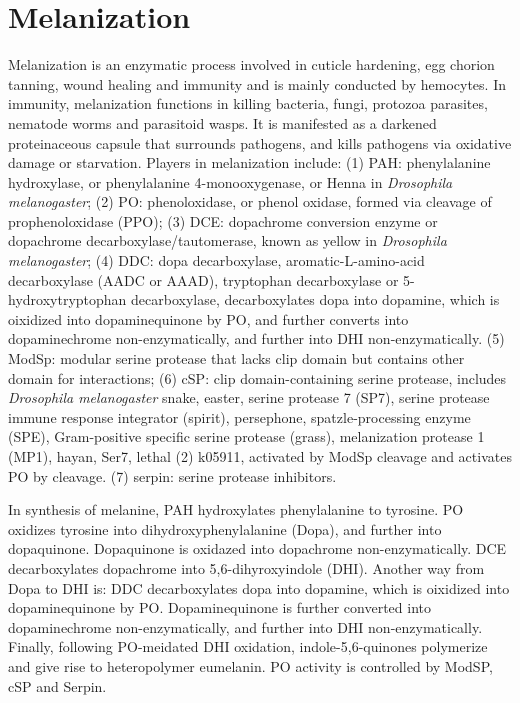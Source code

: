 \documentclass[11pt]{article}
\begin{document}
\begin{sloppypar}
\section*{Melanization}
Melanization is an enzymatic process involved in cuticle hardening, egg chorion tanning, wound healing and immunity and is mainly conducted by hemocytes. 
In immunity, melanization functions in killing bacteria, fungi, protozoa parasites, nematode worms and parasitoid wasps. 
It is manifested as a darkened proteinaceous capsule that surrounds pathogens, and kills pathogens via oxidative damage or starvation. 
Players in melanization include:
\newline
(1) PAH: phenylalanine hydroxylase, or phenylalanine 4-monooxygenase, or Henna in \textit{Drosophila melanogaster}; \newline
(2) PO: phenoloxidase, or phenol oxidase, formed via cleavage of prophenoloxidase (PPO); \newline
(3) DCE: dopachrome conversion enzyme or dopachrome decarboxylase/tautomerase, known as yellow in \textit{Drosophila melanogaster}; \newline
(4) DDC: dopa decarboxylase, aromatic-L-amino-acid decarboxylase (AADC or AAAD), tryptophan decarboxylase or 5-hydroxytryptophan decarboxylase, decarboxylates dopa into dopamine, which is oixidized into dopaminequinone by PO, and further converts into dopaminechrome non-enzymatically, and further into DHI non-enzymatically. \newline 
(5) ModSp: modular serine protease that lacks clip domain but contains other domain for interactions; \newline
(6) cSP: clip domain-containing serine protease, includes \textit{Drosophila melanogaster} 
  snake, easter, serine protease 7 (SP7), serine protease immune response integrator (spirit), persephone, spatzle-processing enzyme (SPE), Gram-positive specific serine protease (grass), melanization protease 1 (MP1), hayan, Ser7, lethal (2) k05911, 
activated by ModSp cleavage and activates PO by cleavage. \newline
(7) serpin: serine protease inhibitors. 

\par

In synthesis of melanine, PAH hydroxylates phenylalanine to tyrosine. 
PO oxidizes tyrosine into dihydroxyphenylalanine (Dopa), and further into dopaquinone. 
Dopaquinone is oxidazed into dopachrome non-enzymatically. 
DCE decarboxylates dopachrome into 5,6-dihyroxyindole (DHI). 
Another way from Dopa to DHI is: 
DDC decarboxylates dopa into dopamine, which is oixidized into dopaminequinone by PO. 
Dopaminequinone is further converted into dopaminechrome non-enzymatically, and further into DHI non-enzymatically. 
Finally, following PO-meidated DHI oxidation, indole-5,6-quinones polymerize and give rise to heteropolymer eumelanin. 
PO activity is controlled by ModSP, cSP and Serpin.



\end{sloppypar}
\end{document}
